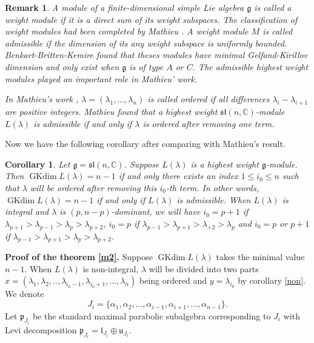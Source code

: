 \documentclass{amsart}[12pt]
\newtheorem{Cor}{Corollary}[section]
\newtheorem{Rem}{Remark}[section]
\newcommand{\gkd}{\operatorname{GKdim}}
\numberwithin{equation}{section}
\begin{document}
\begin{Rem}
A module of a finite-dimensional simple Lie algebra $\mathfrak{g}$ is called a
\emph{weight module} if it is a direct sum of its weight subspaces. The classification of weight modules had been completed by Mathieu \cite{Ma}.
A weight module $M$ is called \emph{admissible} if the dimension of its any weight subspace is uniformly bounded. Benkart-Britten-Kemire \cite{BBL}  found that theses modules have minimal Gelfand-Kirillov dimension and only exist when $\mathfrak{g}$ is of type $A$ or $C$.
The admissible highest weight modules played an important role in Mathieu' work.



In Mathieu's work \cite{Ma}, $\lambda=(\lambda_1,...,\lambda_n)$ is called \emph{ordered} if all differences $\lambda_i-\lambda_{i+1}$ are positive integers.
Mathieu found that a highest weight $\mathfrak{sl}(n, \mathbb{C})$-module $L(\lambda)$ is admissible if and only if $\lambda$ is ordered after removing one term.
\end{Rem}

Now we have the following corollary after comparing with Mathieu's result.
\begin{Cor}
Let $ \mathfrak{g}=\mathfrak{sl}(n,\mathbb{C}) $. Suppose $L(\lambda)$ is a  highest weight $\mathfrak{g}$-module. Then   $\gkd L(\lambda)=n-1$  if and only   there exists an  index $1\leq i_0\leq n$ such that  $\lambda$ will be ordered after removing this $i_0$-th  term.
In other words, $\gkd L(\lambda)=n-1$  if and only if $L(\lambda)$ is admissible. When $L(\lambda)$ is integral and $\lambda$ is  $ (p,n-p) $-dominant, we will have $i_0=p+1$ if $\lambda_{p+1}>\lambda_{p-1}>\lambda_p>\lambda_{p+2}$, $i_0=p$ if $\lambda_{p-1}>\lambda_{p+1}>\lambda_{+2}>\lambda_{p}$ and $i_0=p$ or $p+1$ if $\lambda_{p-1}>\lambda_{p+1}>\lambda_p>\lambda_{p+2}$.
\end{Cor}

{\bf Proof of the theorem \ref{m2}.}
Suppose $\gkd L(\lambda)$ takes the minimal value $n-1$. When $L(\lambda)$ is non-integral,
 $\lambda$ will be divided into two parts $x=(\lambda_1,\lambda_2,..,\lambda_{i_0-1},\lambda_{i_0+1},\dots,\lambda_n)$ being ordered and $y=\lambda_{i_0}$ by corollary \ref{non}. We denote $$J_i=\{\alpha_{1},\alpha_{2},...,\alpha_{i-1},\alpha_{i+1},...,\alpha_{n-1}\}.$$ Let $\mathfrak{p}_{J_i}$ be the standard maximal parabolic subalgebra corresponding to $J_i$ with Levi decomposition $\mathfrak{p}_{J_i}=\mathfrak{l}_{J_i}\oplus \mathfrak{u}_{J_i}$. 
 
\end{document}
